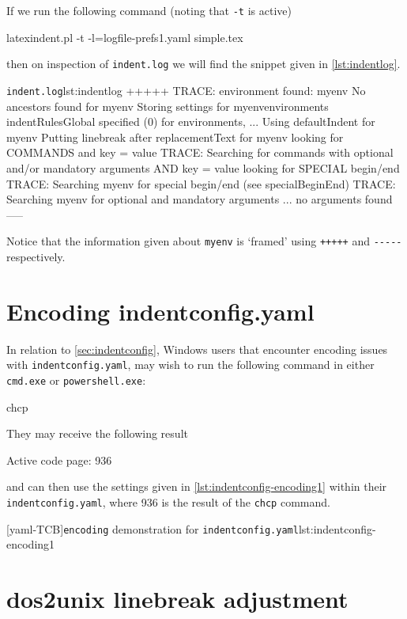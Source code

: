 	 If we run the following command (noting that \texttt{-t} is active)
	 \begin{commandshell}
latexindent.pl -t -l=logfile-prefs1.yaml simple.tex 
\end{commandshell}
	 then on inspection of \texttt{indent.log} we will find the snippet given in
	 \cref{lst:indentlog}.
	 \begin{cmhlistings}[style=tcblatex,morekeywords={TRACE}]{\texttt{indent.log}}{lst:indentlog}
       +++++
TRACE: environment found: myenv
       No ancestors found for myenv
       Storing settings for myenvenvironments
       indentRulesGlobal specified (0) for environments, ...
       Using defaultIndent for myenv
       Putting linebreak after replacementText for myenv
       looking for COMMANDS and key = {value}
TRACE: Searching for commands with optional and/or mandatory arguments AND key = {value}
       looking for SPECIAL begin/end
TRACE: Searching myenv for special begin/end (see specialBeginEnd)
TRACE: Searching myenv for optional and mandatory arguments
       ... no arguments found
       -----
     \end{cmhlistings}
	 Notice that the information given about \texttt{myenv} is `framed' using \texttt{+++++}
	 and \lstinline!-----! respectively.

	\section{Encoding indentconfig.yaml}\label{app:encoding}
	 In relation to \vref{sec:indentconfig}, Windows users that encounter encoding issues with
	 \texttt{indentconfig.yaml}, may wish to run the following command in either
	 \texttt{cmd.exe} or \texttt{powershell.exe}:
	 \begin{dosprompt}
chcp
    \end{dosprompt}
	 They may receive the following result
	 \begin{dosprompt}
Active code page: 936
    \end{dosprompt}
	 and can then use the settings given in \cref{lst:indentconfig-encoding1} within their
	 \texttt{indentconfig.yaml}, where 936 is the result of the \texttt{chcp} command.

	 [yaml-TCB]{\texttt{encoding} demonstration for \texttt{indentconfig.yaml}}{lst:indentconfig-encoding1}

	\section{dos2unix linebreak adjustment}


